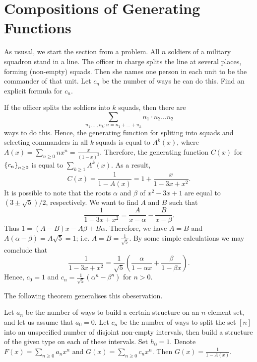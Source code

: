 \section{Compositions of Generating Functions}
As ususal, we start the section from a problem.
All $n$ soldiers of a military squadron stand in a line. The officer in charge
splits the line at several places, forming (non-empty) squads. Then she names
one person in each unit to be the commander of that unit. Let $c_n$ be the
number of ways he can do this. Find an explicit formula for $c_n$.

If the officer splits the soldiers into $k$ squads, then there
are
\[
  \sum_{n_1, \dots, n_k : n = n_1 + \dots + n_k} n_1 \cdot n_2 \dots n_2
\]
ways to do this. Hence, the generating function for spliting into squads and
selecting commanders in all $k$ squads is equal to $A^k(x)$, where
$A(x) = \sum_{n \ge 0} n x^n = \frac{x}{(1 - x)^2}$. Therefore,
the generating function $C(x)$ for $\set{c_n}_{n \ge 0}$ is equal to
$\sum_{k \ge 1} A^k(x)$. As a result,
\[
  C(x) = \frac{1}{1 - A(x)} = 1 + \frac{x}{1 - 3x + x^2}.
\]
It is possible to note that the roots $\alpha$ and $\beta$ of $x^2 - 3x + 1$ are
equal to $(3 \pm \sqrt{5}) / 2$, respectively. We want to find $A$ and $B$ such
that
\[
  \frac{1}{1 - 3x + x^2} = \frac{A}{x - \alpha} - \frac{B}{x - \beta}.
\]
Thus $1 = (A - B) x - A\beta + B\alpha$. Therefore, we have
$A = B$ and $A(\alpha - \beta) = A\sqrt{5} = 1$; i.e.
$A = B = \frac{1}{\sqrt{5}}$.
By some simple calculations we may comclude that
\[
  \frac{1}{1 - 3x + x^2} =
  \frac{1}{\sqrt{5}}(\frac{\alpha}{1 - \alpha x} + \frac{\beta}{1 - \beta x}).
\]
Hence, $c_0 = 1$ and $c_n = \frac{1}{\sqrt{5}}(\alpha^n - \beta^n)$ for $n > 0$.

The following theorem generalises this obeservation.
\begin{theorem}
  Let $a_n$ be the number of ways to build a certain structure on an $n$-element
  set, and let us assume that $a_0 = 0$. Let $c_n$ be the number of ways to
  split the set $[n]$ into an unspecified number of disjoint non-empty
  intervals, then build a structure of the given type on each of these
  intervals. Set $h_0 = 1$. Denote $F(x) = \sum_{n \ge 0} a_n x^n$ and
  $G(x) = \sum_{n \ge 0} c_n x^n$. Then $G(x) = \frac{1}{1 - A(x)}$.
\end{theorem}
